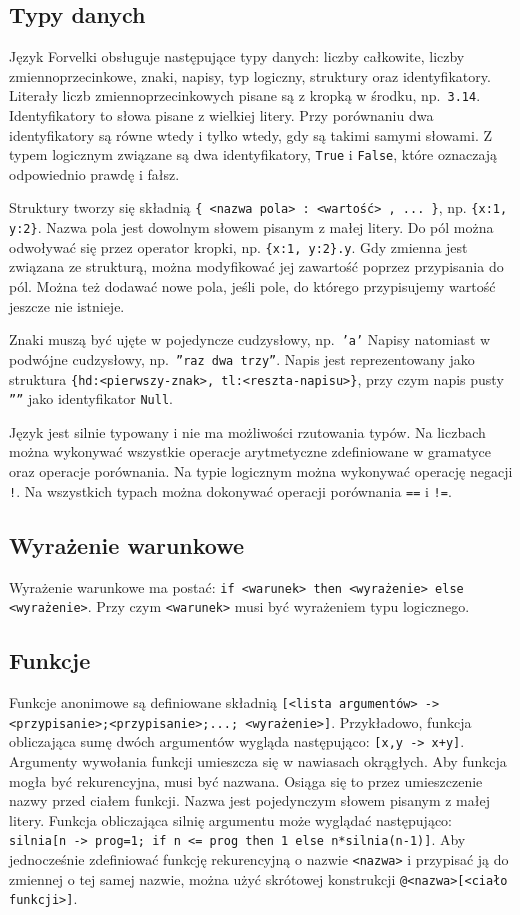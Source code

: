 \documentclass[4paper,10pt]{article}
\begin{document}
\subsection{Typy danych}
Język Forvelki obsługuje następujące typy danych: liczby całkowite, liczby zmiennoprzecinkowe, znaki, napisy, typ logiczny, struktury oraz identyfikatory.
Literały liczb zmiennoprzecinkowych pisane są z kropką w środku, np.~\texttt{3.14}.
Identyfikatory to słowa pisane z wielkiej litery.
Przy porównaniu dwa identyfikatory są równe wtedy i tylko wtedy, gdy są takimi samymi słowami.
Z typem logicznym związane są dwa identyfikatory, \texttt{True} i \texttt{False}, które oznaczają odpowiednio prawdę i fałsz.

Struktury tworzy się składnią \texttt{\{ <nazwa pola> : <wartość> , ... \}}, np. \texttt{\{x:1, y:2\}}.
Nazwa pola jest dowolnym słowem pisanym z małej litery.
Do pól można odwoływać się przez operator kropki, np. \texttt{\{x:1,~y:2\}.y}.
Gdy zmienna jest związana ze strukturą, można modyfikować jej zawartość poprzez przypisania do pól.
Można też dodawać nowe pola, jeśli pole, do którego przypisujemy wartość jeszcze nie istnieje.

Znaki muszą być ujęte w pojedyncze cudzysłowy, np.~\texttt{'a'}
Napisy natomiast w podwójne cudzysłowy, np.~\texttt{''raz dwa trzy''}.
Napis jest reprezentowany jako struktura \texttt{\{hd:<pierwszy-znak>,~tl:<reszta-napisu>\}}, przy czym napis pusty \texttt{''''} jako identyfikator \texttt{Null}.

Język jest silnie typowany i nie ma możliwości rzutowania typów.
Na liczbach można wykonywać wszystkie operacje arytmetyczne zdefiniowane w gramatyce oraz operacje porównania.
Na typie logicznym można wykonywać operację negacji \texttt{!}.
Na wszystkich typach można dokonywać operacji porównania \texttt{==} i \texttt{!=}.

\subsection{Wyrażenie warunkowe}
Wyrażenie warunkowe ma postać:
\texttt{if <warunek> then <wyrażenie> else <wyrażenie>}.
Przy czym \texttt{<warunek>} musi być wyrażeniem typu logicznego.

\subsection{Funkcje}
Funkcje anonimowe są definiowane składnią \texttt{[<lista argumentów> -> <przypisanie>;<przypisanie>;...; <wyrażenie>]}.
Przykładowo, funkcja obliczająca sumę dwóch argumentów wygląda następująco: \texttt{[x,y~->~x+y]}.
Argumenty wywołania funkcji umieszcza się w nawiasach okrągłych.
Aby funkcja mogła być rekurencyjna, musi być nazwana.
Osiąga się to przez umieszczenie nazwy przed ciałem funkcji.
Nazwa jest pojedynczym słowem pisanym z małej litery.
Funkcja obliczająca silnię argumentu może wyglądać następująco: \texttt{silnia[n -> prog=1; if n <= prog then 1 else n*silnia(n-1)]}.
Aby jednocześnie zdefiniować funkcję rekurencyjną o nazwie \texttt{<nazwa>} i przypisać ją do zmiennej o tej samej nazwie, można użyć skrótowej konstrukcji \texttt{@<nazwa>[<ciało funkcji>]}.
\end{document}
